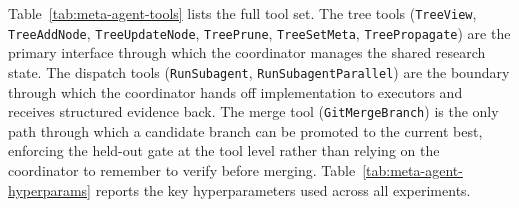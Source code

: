 \documentclass{llmxive}
\begin{document}
Table~\ref{tab:meta-agent-tools} lists the full tool set. The tree tools
(\texttt{TreeView}, \texttt{TreeAddNode}, \texttt{TreeUpdateNode},
\texttt{TreePrune}, \texttt{TreeSetMeta}, \texttt{TreePropagate}) are the
primary interface through which the coordinator manages the shared research
state. The dispatch tools (\texttt{RunSubagent},
\texttt{RunSubagentParallel}) are the boundary through which the coordinator
hands off implementation to executors and receives structured evidence back.
The merge tool (\texttt{GitMergeBranch}) is the only path through which a
candidate branch can be promoted to the current best, enforcing the held-out gate at the
tool level rather than relying on the coordinator to remember to verify
before merging. Table~\ref{tab:meta-agent-hyperparams} reports the key
hyperparameters used across all experiments.
\end{document}
